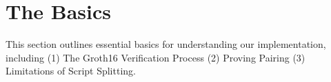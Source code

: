 \section{The Basics} \label{sec:basics}
This section outlines essential basics for understanding our implementation, including (1) The Groth16 Verification Process (2) Proving Pairing (3) Limitations of Script Splitting.	 		








